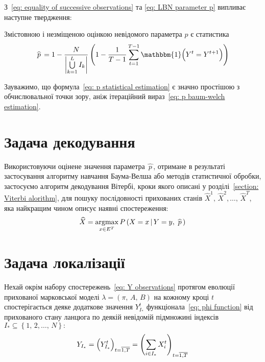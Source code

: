 З~\eqref{eq: equality of successive observations} та \eqref{eq: LBN parameter p} випливає наступне твердження:

\begin{claim}
    Змістовною і незміщеною оцінкою невідомого параметра $p$ є статистика
    \begin{equation}\label{eq: p statistical estimation}
        \widehat{\,p\,} = 1-\frac{N}{\left| \bigcup\limits_{k=1}^{L}I_k \right|} \left( 1-\frac{1}{T-1}\sum_{t=1}^{T-1}\mathbbm{1} \Bigl( Y^t=Y^{t+1} \Bigr) \right)
    \end{equation}
\end{claim}

Зауважимо, що формула~\eqref{eq: p statistical estimation} є значно простішою з обчислювальної точки зору, аніж ітераційний вираз~\eqref{eq: p baum-welch estimation}.

\section{Задача декодування}

Використовуючи оцінене значення параметра $\widehat{\,p\,}$, отримане в результаті застосування алгоритму навчання Баума-Велша або методів статистичної обробки, застосуємо алгоритм декодування Вітербі, кроки якого описані у розділі~\ref{section: Viterbi alorithm}, для пошуку послідовності прихованих станів $\widehat{X}^1,\,\widehat{X}^2,\ldots,\,\widehat{X}^T$, яка найкращим чином описує наявні спостереження:
\begin{equation}\label{eq: decoded stated}
    \widehat{X} = \operatorname*{argmax}\limits_{x \in E^T} P\left( X=x\,|\,Y=y,\,\widehat{\,p\,} \right)
\end{equation}

\section{Задача локалізації}

Нехай окрім набору спостережень~\eqref{eq: Y observations} протягом еволюції прихованої марковської моделі $\lambda=(\pi,\,A,\,B)$ на кожному кроці $t$ спостерігається деяке додаткове значення $Y^t_{I_*}$ функціонала~\eqref{eq: phi function} від прихованого стану ланцюга по деякій невідомій підмножині індексів $I_* \subseteq \left\{ 1,\,2,\ldots,\,N \right\}:$
\begin{equation*}
    Y_{I_*} = \Bigl( Y^t_{I_*} \Bigr)_{t=\overline{1,T}} = \left( \sum_{i \in I_*} X^t_i \right)_{t=\overline{1,T}} 
\end{equation*}

